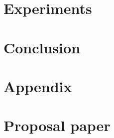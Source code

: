 \documentclass[12pt]{article}
\begin{document}
\section{Experiments}
    \label{sec:evaluation}
    


\section{Conclusion}
    \label{sec:conclusion}
    




\newpage
\appendix
\section{Appendix}


\section{Proposal paper}

\newpage
{}
\tableofcontents
\end{document}
